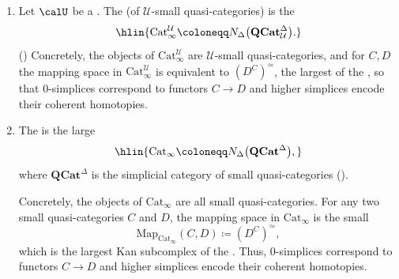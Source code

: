\begin{definition} \label{definition:infty_category_of_infty_categories}
    \begin{enumerate}
        \item Let $\calU$ be a .
        The  (of $\mathcal U$-small quasi-categories) is the 
        $$\hlin{\mathrm{Cat}_\infty^{\mathcal U}\coloneqq N_\Delta\big(\mathbf{QCat}_{\mathcal U}^\Delta\big).}$$
        ()
        Concretely, the objects of $\mathrm{Cat}_\infty^{\mathcal U}$ are $\mathcal U$-small quasi-categories, and for $C,D$ the mapping space in $\mathrm{Cat}_\infty^{\mathcal U}$ is equivalent to $(D^C)^{\simeq}$, the largest  of the , so that $0$-simplices correspond to functors $C\to D$ and higher simplices encode their coherent homotopies.

        \item The  is the large 
        $$\hlin{\mathrm{Cat}_\infty \coloneqq N_\Delta\big(\mathbf{QCat}^\Delta\big),}$$
        where $\mathbf{QCat}^\Delta$ is the simplicial category of small quasi-categories ().
        
        Concretely, the objects of $\mathrm{Cat}_\infty$ are all small quasi-categories. For any two small quasi-categories $C$ and $D$, the mapping space in $\mathrm{Cat}_\infty$ is the small 
        $$\mathrm{Map}_{\mathrm{Cat}_\infty}(C, D) \coloneqq (D^C)^{\simeq},$$
        which is the largest Kan subcomplex of the . Thus, $0$-simplices correspond to functors $C\to D$ and higher simplices encode their coherent homotopies.
    \end{enumerate}
\end{definition}
